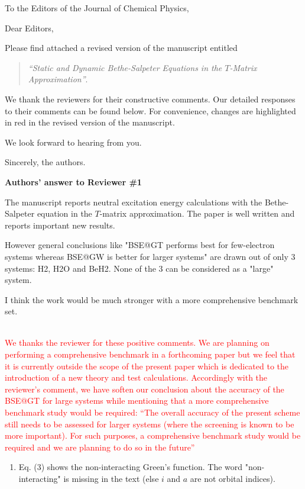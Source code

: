 \documentclass[10pt]{letter}
\newcommand{\alert}[1]{\textcolor{red}{#1}}
\begin{document}
\begin{letter}%
{To the Editors of the Journal of Chemical Physics,}

\opening{Dear Editors,}

\justifying
Please find attached a revised version of the manuscript entitled 
\begin{quote}
	\textit{``Static and Dynamic Bethe-Salpeter Equations in the $T$-Matrix Approximation''}.
\end{quote}
We thank the reviewers for their constructive comments.
Our detailed responses to their comments can be found below.
For convenience, changes are highlighted in red in the revised version of the manuscript. 

We look forward to hearing from you.

\closing{Sincerely, the authors.}

\newpage

\noindent \textbf{\large Authors' answer to Reviewer \#1}
 
{The manuscript reports neutral excitation energy calculations with the Bethe-Salpeter equation in the $T$-matrix approximation. 
The paper is well written and reports important new results. 

However general conclusions like "BSE@GT performs best for few-electron systems whereas BSE@GW is better for larger systems" 
are drawn out of only 3 systems: H2, H2O and BeH2. None of the 3 can be considered as a "large" system. 

I think the work would be much stronger with a more comprehensive benchmark set.}
\\
\alert{
We thanks the reviewer for these positive comments.
We are planning on performing a comprehensive benchmark in a forthcoming paper but we feel that it is currently outside the scope of the present paper which is dedicated to the introduction of a new theory and test calculations.
Accordingly with the reviewer's comment, we have soften our conclusion about the accuracy of the BSE@GT for large systems while mentioning that a more comprehensive benchmark study would be required:
``The overall accuracy of the present scheme still needs to be assessed for larger systems (where the screening is known to be more important). 
For such purposes, a comprehensive benchmark study would be required and we are planning to do so in the future''
}

\begin{enumerate}

\item 
{Eq. (3) shows the non-interacting Green's function. 
The word "non-interacting" is missing in the text (else $i$ and $a$ are not orbital indices). }
\\
\alert{
}


\end{enumerate}
\end{letter}
\end{document}
